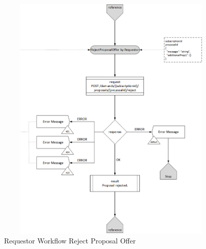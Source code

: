 \begin{enumerate}
\begin{figure}[htbp]
    \centering
    \includegraphics[width=12cm,height=12cm,angle=0]{./diag/Workflow/Market/RejectProposalOffer-R-Workflow.png}
    \caption{Requestor Workflow Reject Proposal Offer }
	\label{fig:RPO}
\end{figure}


\end{enumerate}

\newpage


